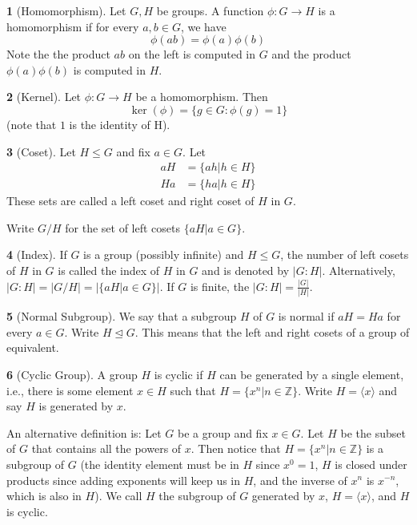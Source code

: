 \documentclass[12pt]{article}
\theoremstyle{definition}
\newtheorem{definition}{\color{NavyBlue}{\textbf{Definition}}}
\begin{document}
\begin{definition}[Homomorphism]
Let $G, H$ be groups. A function $\phi : G \to H$ is a homomorphism if for every $a,b \in G$, we have
\begin{equation}
\phi(ab) = \phi(a)\phi(b)
\end{equation}
Note the the product $ab$ on the left is computed in $G$ and the product $\phi(a)\phi(b)$ is computed in $H$.
\end{definition}

\begin{definition}[Kernel]
Let $\phi:G \to H$ be a homomorphism. Then
\begin{equation}
\ker(\phi) = \{g \in G : \phi(g) = 1 \}
\end{equation}
(note that $1$ is the identity of H).
\end{definition}

\begin{definition}[Coset]
Let $H \leq G$ and fix $a \in G$. Let
\begin{align*}
aH &= \{ ah | h \in H \} \\
Ha &= \{ ha | h \in H \}
\end{align*}
These sets are called a left coset and right coset of $H$ in $G$.

Write $G/H$ for the set of left cosets $\{aH | a \in G \}$.
\end{definition}

\begin{definition}[Index]
If $G$ is a group (possibly infinite) and $H \leq G$, the number of left cosets of $H$ in $G$ is called the index of $H$ in $G$ and is denoted by $|G : H|$. Alternatively, $|G : H| = | G / H | =  |\{aH | a \in G\} |$. If $G$ is finite, the $|G:H| = \frac{|G|}{|H|}$.
\end{definition}

\begin{definition}[Normal Subgroup]
We say that a subgroup $H$ of $G$ is normal if $aH = Ha$ for every $a \in G$. Write $H \trianglelefteq G$. This means that the left and right cosets of a group of equivalent.
\end{definition}

\begin{definition}[Cyclic Group]
A group $H$ is cyclic if $H$ can be generated by a single element, i.e., there is some element $x \in H$ such that $H = \{x^n | n \in \mathbb{Z} \}$. Write $H  = \langle x \rangle$ and say $H$ is generated by $x$.

An alternative definition is: Let $G$ be a group and fix $x \in G$. Let $H$ be the subset of $G$ that contains all the powers of $x$. Then notice that $H = \{x^n | n \in \mathbb{Z} \}$ is a subgroup of $G$ (the identity element must be in $H$ since $x^0 = 1$, $H$ is closed under products since adding exponents will keep us in $H$, and the inverse of $x^n$ is $x^{-n}$, which is also in $H$). We call $H$ the subgroup of $G$ generated by $x$, $H = \langle x \rangle$, and $H$ is cyclic.
\end{definition}
\end{document}
